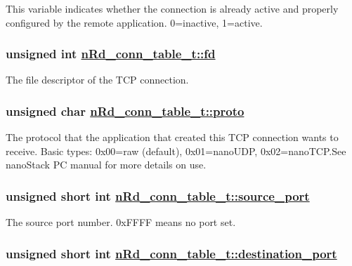 This variable indicates whether the connection is already active and properly configured by the remote application. 0=inactive, 1=active. \hypertarget{structnRd__conn__table__t_a5c0f98d682b0b0c72b3d4d62b086f05}{
\subsubsection[fd]{\setlength{\rightskip}{0pt plus 5cm}unsigned int \hyperlink{structnRd__conn__table__t_a5c0f98d682b0b0c72b3d4d62b086f05}{n\-Rd\_\-conn\_\-table\_\-t::fd}}}
\label{structnRd__conn__table__t_a5c0f98d682b0b0c72b3d4d62b086f05}


The file descriptor of the TCP connection. \hypertarget{structnRd__conn__table__t_6c975baed728a05b1bd47c7c13f2d50e}{
\subsubsection[proto]{\setlength{\rightskip}{0pt plus 5cm}unsigned char \hyperlink{structnRd__conn__table__t_6c975baed728a05b1bd47c7c13f2d50e}{n\-Rd\_\-conn\_\-table\_\-t::proto}}}
\label{structnRd__conn__table__t_6c975baed728a05b1bd47c7c13f2d50e}


The protocol that the application that created this TCP connection wants to receive. Basic types: 0x00=raw (default), 0x01=nano\-UDP, 0x02=nano\-TCP.See nano\-Stack PC manual for more details on use. \hypertarget{structnRd__conn__table__t_f096eab8cfea2f2bb18763a05114c3f5}{
\subsubsection[source\_\-port]{\setlength{\rightskip}{0pt plus 5cm}unsigned short int \hyperlink{structnRd__conn__table__t_f096eab8cfea2f2bb18763a05114c3f5}{n\-Rd\_\-conn\_\-table\_\-t::source\_\-port}}}
\label{structnRd__conn__table__t_f096eab8cfea2f2bb18763a05114c3f5}


The source port number. 0x\-FFFF means no port set. \hypertarget{structnRd__conn__table__t_c53b007ada85589b07305a287e3173cd}{
\subsubsection[destination\_\-port]{\setlength{\rightskip}{0pt plus 5cm}unsigned short int \hyperlink{structnRd__conn__table__t_c53b007ada85589b07305a287e3173cd}{n\-Rd\_\-conn\_\-table\_\-t::destination\_\-port}}}
\label{structnRd__conn__table__t_c53b007ada85589b07305a287e3173cd}


